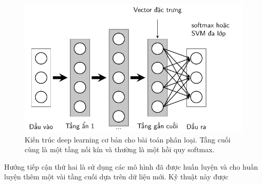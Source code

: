  
\begin{figure}[t]
\centering
    \includegraphics[width = \textwidth]{Chapters/01_Overview/q2_tl/latex/multi_layers.pdf}
    \caption[]{Kiến trúc deep learning cơ bản cho bài toán phân loại. Tầng cuối cùng là một tầng nối kín và thường là một hồi quy softmax.}
    \label{fig:transferlearning}
\end{figure}
Hướng tiếp cận thứ hai là sử dụng các mô hình đã được huấn luyện và cho huấn luyện thêm một vài tầng cuối dựa trên dữ liệu mới. Kỹ thuật này được
